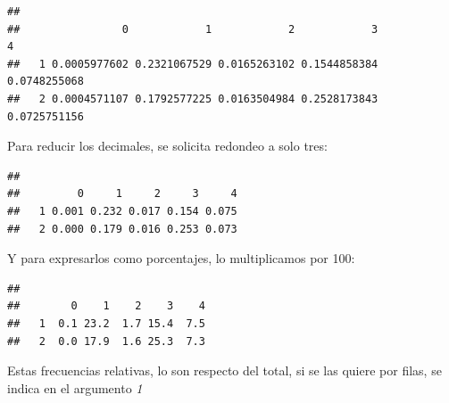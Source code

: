 \documentclass[]{book}
\newenvironment{Shaded}{\begin{snugshade}}{\end{snugshade}}
\newcommand{\DecValTok}[1]{\textcolor[rgb]{0.00,0.00,0.81}{#1}}
\newcommand{\FloatTok}[1]{\textcolor[rgb]{0.00,0.00,0.81}{#1}}
\newcommand{\KeywordTok}[1]{\textcolor[rgb]{0.13,0.29,0.53}{\textbf{#1}}}
\newcommand{\NormalTok}[1]{#1}
\newcommand{\OperatorTok}[1]{\textcolor[rgb]{0.81,0.36,0.00}{\textbf{#1}}}
\newcommand{\StringTok}[1]{\textcolor[rgb]{0.31,0.60,0.02}{#1}}
\begin{document}
\begin{verbatim}
##    
##                0            1            2            3            4
##   1 0.0005977602 0.2321067529 0.0165263102 0.1544858384 0.0748255068
##   2 0.0004571107 0.1792577225 0.0163504984 0.2528173843 0.0725751156
\end{verbatim}

Para reducir los decimales, se solicita redondeo a solo tres:

\begin{Shaded}
\end{Shaded}

\begin{verbatim}
##    
##         0     1     2     3     4
##   1 0.001 0.232 0.017 0.154 0.075
##   2 0.000 0.179 0.016 0.253 0.073
\end{verbatim}

Y para expresarlos como porcentajes, lo multiplicamos por 100:

\begin{Shaded}
\end{Shaded}

\begin{verbatim}
##    
##        0    1    2    3    4
##   1  0.1 23.2  1.7 15.4  7.5
##   2  0.0 17.9  1.6 25.3  7.3
\end{verbatim}

Estas frecuencias relativas, lo son respecto del total, si se las quiere por filas, se indica en el argumento \emph{1}

\begin{Shaded}
\end{Shaded}
\end{document}
